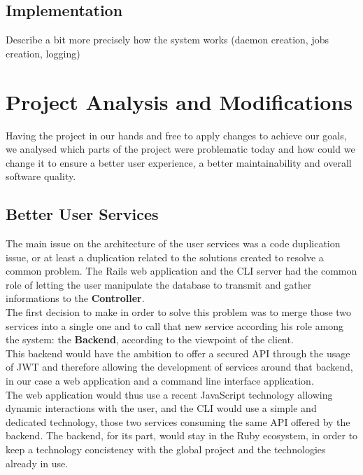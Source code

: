 \documentclass{eplmastersthesis}
\begin{document}
      \subsection{Implementation}

        Describe a bit more precisely how the system works (daemon creation,
        jobs creation, logging)

    \section{Project Analysis and Modifications}

      Having the project in our hands and free to apply changes to achieve our
      goals, we analysed which parts of the project were problematic today and
      how could we change it to ensure a better user experience, a better
      maintainability and overall software quality.

      \subsection{Better User Services}

        The main issue on the architecture of the user services was a code
        duplication issue, or at least a duplication related to the solutions
        created to resolve a common problem. The Rails web application and the
        CLI server had the common role of letting the user manipulate the
        database to transmit and gather informations to the \textbf{Controller}.\\

        The first decision to make in order to solve this problem was to
        merge those two services into a single one and to call that new
        service according his role among the system: the \textbf{Backend},
        according to the viewpoint of the client.\\
        This backend would have the ambition to offer a secured API through
        the usage of JWT \cite{JWT} and therefore allowing the development
        of services around that backend, in our case a web application and
        a command line interface application.\\

        The web application would thus use a recent JavaScript technology
        allowing dynamic interactions with the user, and the CLI would use
        a simple and dedicated technology, those two services consuming the
        same API offered by the backend. The backend, for its part, would
        stay in the Ruby ecosystem, in order to keep a technology concistency
        with the global project and the technologies already in use.
\end{document}
